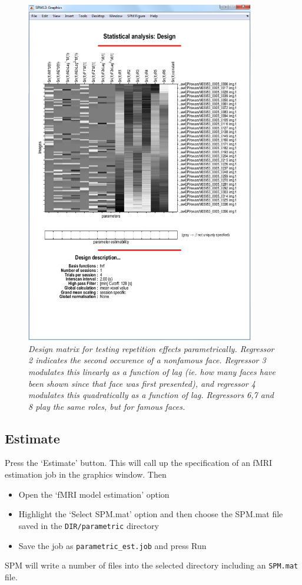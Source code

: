 \documentclass[a4paper,titlepage]{book}
\newcommand{\bi}{\begin{itemize}}
\newcommand{\ei}{\end{itemize}}
\begin{document}
\begin{figure}
\begin{center}
\includegraphics[width=100mm]{faces/par_design}
\caption{\em Design matrix for testing repetition effects parametrically. Regressor 2 indicates the second occurence of a nonfamous face. Regressor 3 modulates this linearly as a function of lag (ie. how many faces have been shown since that face was first presented), and regressor 4 modulates this quadratically as a function of lag. Regressors 6,7 and 8 play the same roles, but for famous faces. \label{par_design} }
\end{center}
\end{figure}

\subsection{Estimate}

Press the `Estimate' button. This will call up the specification of an fMRI estimation job in the graphics window. Then
\bi
\item{Open the `fMRI model estimation' option}
\item{Highlight the `Select SPM.mat' option and then choose the SPM.mat
file saved in the \verb!DIR/parametric! directory}
\item{Save the job as \verb!parametric_est.job! and press Run}
\ei
SPM will write a number of files into the selected directory including 
an \verb!SPM.mat! file.
\end{document}

